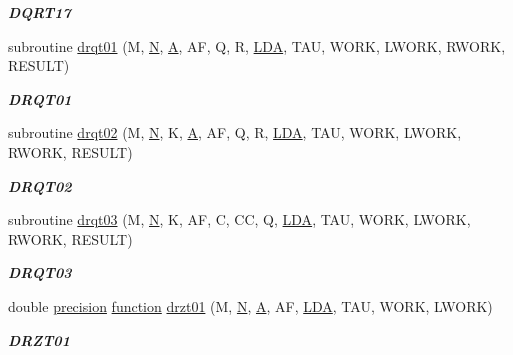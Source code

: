 \begin{DoxyCompactItemize}
\begin{DoxyCompactList}\small\item\em {\bfseries D\+Q\+R\+T17} \end{DoxyCompactList}\item 
subroutine \hyperlink{group__double__lin_gac55f0c1ae26dd3f203b8723a101782b3}{drqt01} (M, \hyperlink{polmisc_8c_a0240ac851181b84ac374872dc5434ee4}{N}, \hyperlink{classA}{A}, A\+F, Q, R, \hyperlink{example__user_8c_ae946da542ce0db94dced19b2ecefd1aa}{L\+D\+A}, T\+A\+U, W\+O\+R\+K, L\+W\+O\+R\+K, R\+W\+O\+R\+K, R\+E\+S\+U\+L\+T)
\begin{DoxyCompactList}\small\item\em {\bfseries D\+R\+Q\+T01} \end{DoxyCompactList}\item 
subroutine \hyperlink{group__double__lin_ga4283af2af02413c223db2beb14987e4d}{drqt02} (M, \hyperlink{polmisc_8c_a0240ac851181b84ac374872dc5434ee4}{N}, K, \hyperlink{classA}{A}, A\+F, Q, R, \hyperlink{example__user_8c_ae946da542ce0db94dced19b2ecefd1aa}{L\+D\+A}, T\+A\+U, W\+O\+R\+K, L\+W\+O\+R\+K, R\+W\+O\+R\+K, R\+E\+S\+U\+L\+T)
\begin{DoxyCompactList}\small\item\em {\bfseries D\+R\+Q\+T02} \end{DoxyCompactList}\item 
subroutine \hyperlink{group__double__lin_gab64c437791b0cdd46ef2389ab2f410f6}{drqt03} (M, \hyperlink{polmisc_8c_a0240ac851181b84ac374872dc5434ee4}{N}, K, A\+F, C, C\+C, Q, \hyperlink{example__user_8c_ae946da542ce0db94dced19b2ecefd1aa}{L\+D\+A}, T\+A\+U, W\+O\+R\+K, L\+W\+O\+R\+K, R\+W\+O\+R\+K, R\+E\+S\+U\+L\+T)
\begin{DoxyCompactList}\small\item\em {\bfseries D\+R\+Q\+T03} \end{DoxyCompactList}\item 
double \hyperlink{numinquire_8h_a2c8e616467665d0b2814d4c1589ba74e}{precision} \hyperlink{afunc_8m_a7b5e596df91eadea6c537c0825e894a7}{function} \hyperlink{group__double__lin_ga5b6c004ab25d96b8bcf90451c2b2036d}{drzt01} (M, \hyperlink{polmisc_8c_a0240ac851181b84ac374872dc5434ee4}{N}, \hyperlink{classA}{A}, A\+F, \hyperlink{example__user_8c_ae946da542ce0db94dced19b2ecefd1aa}{L\+D\+A}, T\+A\+U, W\+O\+R\+K, L\+W\+O\+R\+K)
\begin{DoxyCompactList}\small\item\em {\bfseries D\+R\+Z\+T01} \end{DoxyCompactList}\item 

\end{DoxyCompactItemize}
